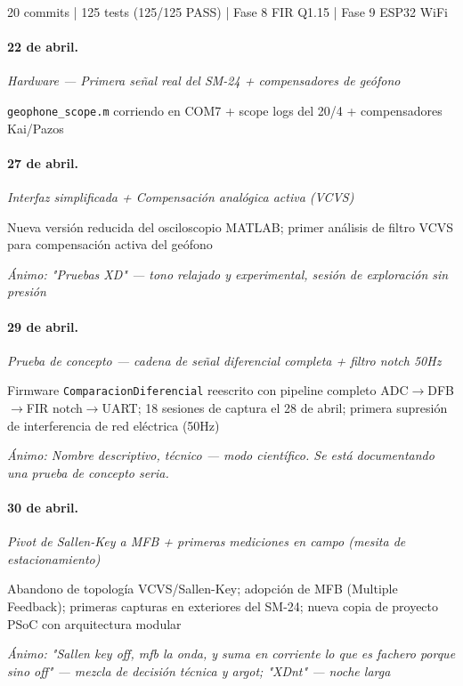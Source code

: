 20 commits | 125 tests (125/125 PASS) | Fase 8 FIR Q1.15 | Fase 9 ESP32 WiFi

\paragraph{22 de abril.}
\emph{Hardware --- Primera señal real del SM-24 + compensadores de geófono}

\texttt{geophone\_scope.m} corriendo en COM7 + scope logs del 20/4 + compensadores Kai/Pazos

\paragraph{27 de abril.}
\emph{Interfaz simplificada + Compensación analógica activa (VCVS)}

Nueva versión reducida del osciloscopio MATLAB; primer análisis de filtro VCVS para compensación activa del geófono

{\footnotesize\itshape \'Animo: "Pruebas XD" --- tono relajado y experimental, sesión de exploración sin presión}

\paragraph{29 de abril.}
\emph{Prueba de concepto --- cadena de señal diferencial completa + filtro notch 50Hz}

Firmware \texttt{ComparacionDiferencial} reescrito con pipeline completo ADC$\rightarrow$DFB$\rightarrow$FIR notch$\rightarrow$UART; 18 sesiones de captura el 28 de abril; primera supresión de interferencia de red eléctrica (50Hz)

{\footnotesize\itshape \'Animo: Nombre descriptivo, técnico --- modo científico. Se está documentando una prueba de concepto seria.}

\paragraph{30 de abril.}
\emph{Pivot de Sallen-Key a MFB + primeras mediciones en campo (mesita de estacionamiento)}

Abandono de topología VCVS/Sallen-Key; adopción de MFB (Multiple Feedback); primeras capturas en exteriores del SM-24; nueva copia de proyecto PSoC con arquitectura modular

{\footnotesize\itshape \'Animo: "Sallen key off, mfb la onda, y suma en corriente lo que es fachero porque sino off" --- mezcla de decisión técnica y argot; "XDnt" --- noche larga}

